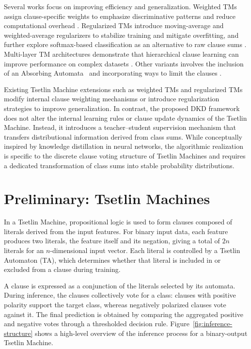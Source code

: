 \documentclass[sn-mathphys-num]{sn-jnl}%
\theoremstyle{thmstyleone}%
\theoremstyle{thmstyletwo}%
\theoremstyle{thmstylethree}%
\begin{document}
Several works focus on improving efficiency and generalization. Weighted TMs assign clause-specific weights to emphasize discriminative patterns and reduce computational overhead \cite{phoulady2019weighted}. Regularized TMs introduce moving-average and weighted-average regularizers to stabilize training and mitigate overfitting, and further explore softmax-based classification as an alternative to raw clause sums \cite{anjum2024novel, softmax}. Multi-layer TM architectures demonstrate that hierarchical clause learning can improve performance on complex datasets \cite{gorbenko2024multi}. Other variants involves the inclusion of an Absorbing Automata~\cite{bhattarai2023contractingtsetlinmachineabsorbing} and incorporating ways to limit the clauses \cite{abeyrathna2023building, 9923795}.

Existing Tsetlin Machine extensions such as weighted TMs and regularized TMs modify internal clause weighting mechanisms or introduce regularization strategies to improve generalization. In contrast, the proposed DKD framework does not alter the internal learning rules or clause update dynamics of the Tsetlin Machine. Instead, it introduces a teacher–student supervision mechanism that transfers distributional information derived from class sums. While conceptually inspired by knowledge distillation in neural networks, the algorithmic realization is specific to the discrete clause voting structure of Tsetlin Machines and requires a dedicated transformation of class sums into stable probability distributions.

\section{Preliminary: Tsetlin Machines}
In a Tsetlin Machine, propositional logic is used to form clauses composed of literals derived from the input features. For binary input data, each feature produces two literals, the feature itself and its negation, giving a total of $2n$ literals for an $n$-dimensional input vector. Each literal is controlled by a Tsetlin Automaton (TA), which determines whether that literal is included in or excluded from a clause during training.

A clause is expressed as a conjunction of the literals selected by its automata. During inference, the clauses collectively vote for a class: clauses with positive polarity support the target class, whereas negatively polarized clauses vote against it. The final prediction is obtained by comparing the aggregated positive and negative votes through a thresholded decision rule. Figure~\ref{fig:inference-structure} shows a high-level overview of the inference process for a binary-output Tsetlin Machine.
\end{document}
